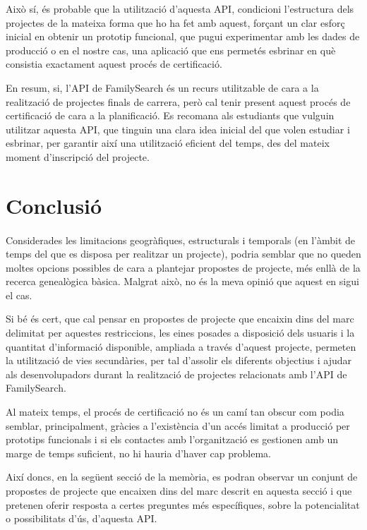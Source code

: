     Això sí, és probable que la utilització d'aquesta API, condicioni l'estructura dels projectes de la mateixa forma que ho ha fet amb aquest, forçant un clar esforç inicial en obtenir un prototip funcional, que pugui experimentar amb les dades de producció o en el nostre cas, una aplicació que ens permetés esbrinar en què consistia exactament aquest procés de certificació.

    En resum, si, l'API de FamilySearch és un recurs utilitzable de cara a la realització de projectes finals de carrera, però cal tenir present aquest procés de certificació de cara a la planificació. Es recomana als estudiants que vulguin utilitzar aquesta API, que tinguin una clara idea inicial del que volen estudiar i esbrinar, per garantir així una utilització eficient del temps, des del mateix moment d'inscripció del projecte.


\section{Conclusió}

    \paragraph{}
    Considerades les limitacions geogràfiques, estructurals i temporals (en l'àmbit de temps del que es disposa per realitzar un projecte), podria semblar que no queden moltes opcions possibles de cara a plantejar propostes de projecte, més enllà de la recerca genealògica bàsica. Malgrat això, no és la meva opinió que aquest en sigui el cas.

    Si bé és cert, que cal pensar en propostes de projecte que encaixin dins del marc delimitat per aquestes restriccions, les eines posades a disposició dels usuaris i la quantitat d'informació disponible, ampliada a través d'aquest projecte, permeten la utilització de vies secundàries, per tal d'assolir els diferents objectius i ajudar als desenvolupadors durant la realització de projectes relacionats amb l'API de FamilySearch.

    Al mateix temps, el procés de certificació no és un camí tan obscur com podia semblar, principalment, gràcies a l'existència d'un accés limitat a producció per prototips funcionals i si els contactes amb l'organització es gestionen amb un marge de temps suficient, no hi hauria d'haver cap problema.

    Així doncs, en la següent secció de la memòria, es podran observar un conjunt de propostes de projecte que encaixen dins del marc descrit en aquesta secció i que pretenen oferir resposta a certes preguntes més específiques, sobre la potencialitat o possibilitats d'ús, d'aquesta API.
